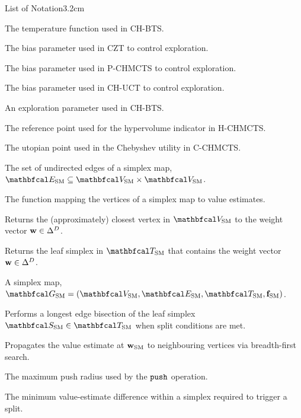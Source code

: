 \begin{mclistof}{List of Notation}{3.2cm}
    \item[$\alphachbts$]
        The temperature function used in CH-BTS.
    \item[$\bczt$]
        The bias parameter used in CZT to control exploration.
    \item[$\bpareto$]
        The bias parameter used in P-CHMCTS to control exploration.
    \item[$\cchuct$]
        The bias parameter used in CH-UCT to control exploration.
    \item[$\epschbts$]
        An exploration parameter used in CH-BTS.
    \item[$\rref$]
        The reference point used for the hypervolume indicator in H-CHMCTS.
    \item[$\ruto$]
        The utopian point used in the Chebyshev utility in C-CHMCTS.
    \item[$\ESM$]
        The set of undirected edges of a simplex map, $\ESM\subseteq\VSM\times\VSM$.
    \item[$\fSM$]
        The function mapping the vertices of a simplex map to value estimates.
    \item[$\fcv(\GSM,\bff{w})$]
        \hspace{2.55cm} Returns the (approximately) closest vertex in $\VSM$ to the weight vector $\mathbf{w}\in\Delta^D$.
    \item[$\fcs(\GSM,\bff{w})$]
        \hspace{3.45cm} Returns the leaf simplex in $\TSM$ that contains the weight vector $\mathbf{w}\in\Delta^D$.
    \item[$\GSM$]
        A simplex map, $\GSM=(\VSM,\ESM,\TSM,\fSM)$.
    \item[$\splitsimplex(\GSM,\SSM)$]
        \hspace{1.2cm} Performs a longest edge bisection of the leaf simplex $\SSM\in\TSM$ when split conditions are met.
    \item[$\push(\GSM,\wSM)$]
        Propagates the value estimate at ${\mathbf{w}_{{\textnormal{SM}}}}$ to neighbouring vertices via breadth-first search.
    \item[$\pushradius$]
        The maximum push radius used by the ${\textnormal{\texttt{push}}}$ operation.
    \item[$\splitmindelta$]
        \hspace{0.5cm} The minimum value-estimate difference within a simplex required to trigger a split.

\end{mclistof}
